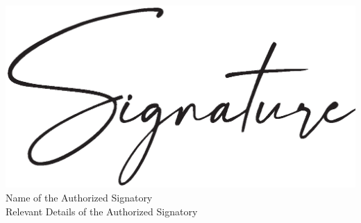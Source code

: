 \begin{flushright}
	
	
		\includegraphics[scale=0.20]{figures/signature.eps} \\	
	
	
	
	
	
		
	
		Name of the Authorized Signatory \\
		
	
	

	
	
			
		Relevant Details of the Authorized Signatory \\
		
	
	
	
	
\end{flushright}